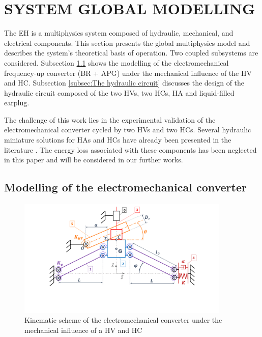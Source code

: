 \documentclass[3p,twocolumn,preprint]{elsarticle}
\begin{document}
\section{SYSTEM GLOBAL MODELLING}
\label{sec:SYSTEM MODELING}
The EH is a multiphysics system composed of hydraulic, mechanical, and electrical components. This section presents the global multiphysics model and describes the system's theoretical basis of operation. Two coupled subsystems are considered. Subsection \ref{subsec:The electromechanical converter} shows the modelling of the electromechanical frequency-up converter (BR + APG) under the mechanical influence of the HV and HC. Subsection \ref{subsec:The hydraulic circuit} discusses the design of the hydraulic circuit composed of the two HVs, two HCs, HA and liquid-filled earplug.

The challenge of this work lies in the experimental validation of the electromechanical converter cycled by two HVs and two HCs. Several hydraulic miniature solutions for HAs and HCs have already been presented in the literature \cite{Wang2020,Xu2021,Zhu2013}. The energy loss associated with these components has been neglected in this paper and will be considered in our further works. 
	\subsection{Modelling of the electromechanical converter}	
	\label{subsec:The electromechanical converter}
\begin{figure}[!htbp]
	\centering
	\captionsetup{justification=centering}
	\includegraphics[trim={0cm 0cm 0cm 0cm},clip, width=0.9\textwidth]{figures/schema_cinematique1.pdf}
	\caption{Kinematic scheme of the electromechanical converter under the mechanical influence of a HV and HC}
	\label{fig:schema_cinematique1}
\end{figure}
\end{document}

